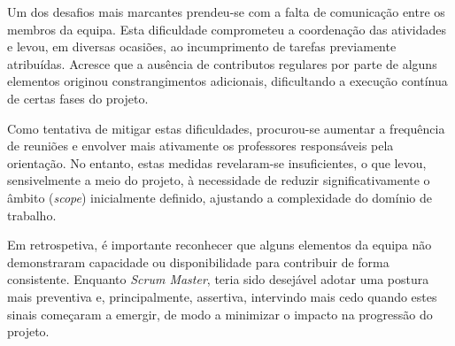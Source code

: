 Um dos desafios mais marcantes prendeu-se com a falta de comunicação entre os membros da equipa. Esta dificuldade comprometeu a coordenação das atividades e levou, em diversas ocasiões, ao incumprimento de tarefas previamente atribuídas. Acresce que a ausência de contributos regulares por parte de alguns elementos originou constrangimentos adicionais, dificultando a execução contínua de certas fases do projeto.

Como tentativa de mitigar estas dificuldades, procurou-se aumentar a frequência de reuniões e envolver mais ativamente os professores responsáveis pela orientação. No entanto, estas medidas revelaram-se insuficientes, o que levou, sensivelmente a meio do projeto, à necessidade de reduzir significativamente o âmbito (\textit{scope}) inicialmente definido, ajustando a complexidade do domínio de trabalho.

Em retrospetiva, é importante reconhecer que alguns elementos da equipa não demonstraram capacidade ou disponibilidade para contribuir de forma consistente. Enquanto \textit{Scrum Master}, teria sido desejável adotar uma postura mais preventiva e, principalmente, assertiva, intervindo mais cedo quando estes sinais começaram a emergir, de modo a minimizar o impacto na progressão do projeto.\